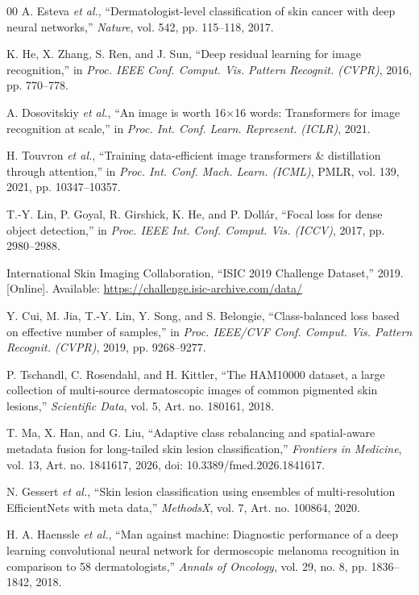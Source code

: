 \documentclass[conference]{IEEEtran}
\begin{document}
\begin{thebibliography}{00}
A. Esteva \emph{et al.}, ``Dermatologist-level classification of skin cancer with deep neural networks,'' \emph{Nature}, vol. 542, pp. 115--118, 2017.

K. He, X. Zhang, S. Ren, and J. Sun, ``Deep residual learning for image recognition,'' in \emph{Proc. IEEE Conf. Comput. Vis. Pattern Recognit. (CVPR)}, 2016, pp. 770--778.

A. Dosovitskiy \emph{et al.}, ``An image is worth 16$\times$16 words: Transformers for image recognition at scale,'' in \emph{Proc. Int. Conf. Learn. Represent. (ICLR)}, 2021.

H. Touvron \emph{et al.}, ``Training data-efficient image transformers \& distillation through attention,'' in \emph{Proc. Int. Conf. Mach. Learn. (ICML)}, PMLR, vol. 139, 2021, pp. 10347--10357.

T.-Y. Lin, P. Goyal, R. Girshick, K. He, and P. Doll\'ar, ``Focal loss for dense object detection,'' in \emph{Proc. IEEE Int. Conf. Comput. Vis. (ICCV)}, 2017, pp. 2980--2988.

International Skin Imaging Collaboration, ``ISIC 2019 Challenge Dataset,'' 2019. [Online]. Available: \url{https://challenge.isic-archive.com/data/}

Y. Cui, M. Jia, T.-Y. Lin, Y. Song, and S. Belongie, ``Class-balanced loss based on effective number of samples,'' in \emph{Proc. IEEE/CVF Conf. Comput. Vis. Pattern Recognit. (CVPR)}, 2019, pp. 9268--9277.

P. Tschandl, C. Rosendahl, and H. Kittler, ``The HAM10000 dataset, a large collection of multi-source dermatoscopic images of common pigmented skin lesions,'' \emph{Scientific Data}, vol. 5, Art. no. 180161, 2018.

T. Ma, X. Han, and G. Liu, ``Adaptive class rebalancing and spatial-aware metadata fusion for long-tailed skin lesion classification,'' \emph{Frontiers in Medicine}, vol. 13, Art. no. 1841617, 2026, doi: 10.3389/fmed.2026.1841617.

N. Gessert \emph{et al.}, ``Skin lesion classification using ensembles of multi-resolution EfficientNets with meta data,'' \emph{MethodsX}, vol. 7, Art. no. 100864, 2020.

H. A. Haenssle \emph{et al.}, ``Man against machine: Diagnostic performance of a deep learning convolutional neural network for dermoscopic melanoma recognition in comparison to 58 dermatologists,'' \emph{Annals of Oncology}, vol. 29, no. 8, pp. 1836--1842, 2018.
\end{thebibliography}
\end{document}
